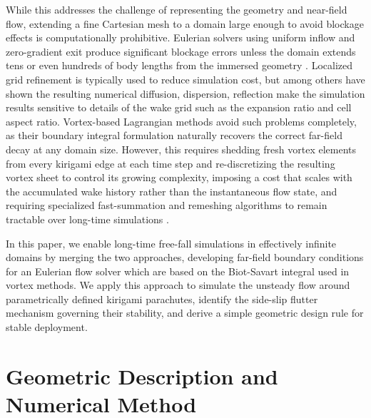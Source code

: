 \documentclass[lineno]{JFM-FLM_Au}
\begin{document}
While this addresses the challenge of representing the geometry and near-field flow, extending a fine Cartesian mesh to a domain large enough to avoid blockage effects is computationally prohibitive. Eulerian solvers using uniform inflow and zero-gradient exit produce significant blockage errors unless the domain extends tens or even hundreds of body lengths from the immersed geometry \citep{Bose2025PorousIncidence}. Localized grid refinement is typically used to reduce simulation cost, but \cite{Colonius2002ADomains} among others have shown the resulting numerical diffusion, dispersion, reflection make the simulation results sensitive to details of the wake grid such as the expansion ratio and cell aspect ratio. Vortex-based Lagrangian methods avoid such problems completely, as their boundary integral formulation naturally recovers the correct far-field decay at any domain size. However, this requires shedding fresh vortex elements from every kirigami edge at each time step and re-discretizing the resulting vortex sheet to control its growing complexity, imposing a cost that scales with the accumulated wake history rather than the instantaneous flow state, and requiring specialized fast-summation and remeshing algorithms to remain tractable over long-time simulations \citep{Koumoutsakos1995High-resolutionMethods,Gillis2019AMethod}.

In this paper, we enable long-time free-fall simulations in effectively infinite domains by merging the two approaches, developing far-field boundary conditions for an Eulerian flow solver which are based on the Biot-Savart integral used in vortex methods. We apply this approach to simulate the unsteady flow around parametrically defined kirigami parachutes, identify the side-slip flutter mechanism governing their stability, and derive a simple geometric design rule for stable deployment.

\section{Geometric Description and Numerical Method}\label{sec:method}
\end{document}
